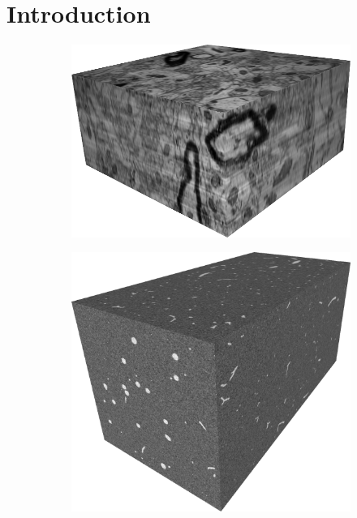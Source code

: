 
\chapter{Introduction}\label{chapter:introduction}

\begin{figure}[t]
	\newcommand{\hwidth}{0.30\textwidth}
	\captionsetup[subfigure]{aboveskip=1pt,belowskip=1pt}
	\centering
	\null\hfill
	\begin{subfigure}[b]{\hwidth}
		\includegraphics[height=.80\textwidth, width=\textwidth,keepaspectratio]{figures/intro/em_im.png}
	\end{subfigure}
	\hfill
	\begin{subfigure}[b]{\hwidth}
		\includegraphics[height=.80\textwidth, width=\textwidth,keepaspectratio]{figures/intro/ct_im.png}

\end{subfigure}
\end{figure}
